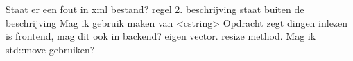 Staat er een fout in xml bestand? regel 2. beschrijving staat buiten de beschrijving
Mag ik gebruik maken van <cstring>
Opdracht zegt dingen inlezen is frontend, mag dit ook in backend?
eigen vector. resize method. Mag ik std::move gebruiken?